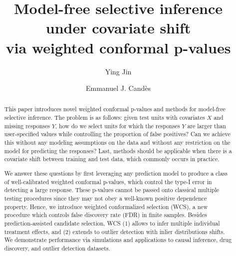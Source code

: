 {\small
}

{\small
}

{\small
}

{\small
}


\title{Model-free selective inference under covariate shift\\ via weighted conformal p-values}
\author[1]{Ying Jin}
\author[1,2]{Emmanuel J. Cand\`es}
\date{}


\maketitle

\begin{abstract}

  This paper introduces novel weighted conformal p-values and methods for model-free selective inference. The problem is as follows: given test units with covariates $X$ and missing responses $Y$, how do we select units for which the responses $Y$ are larger than user-specified values while controlling the proportion of false positives? Can we achieve this without any modeling assumptions on the data and without any restriction on the model for predicting the responses? Last, methods should be applicable when there is a covariate shift between training and test data, which commonly occurs in practice.

  We answer these questions by first leveraging any prediction model to produce a class of well-calibrated weighted conformal p-values, which control the type-I error in detecting a large response. These p-values cannot be passed onto classical multiple testing procedures since they may not obey a well-known positive dependence property. Hence, we introduce weighted conformalized selection (WCS), a new procedure which controls false discovery rate (FDR) in finite samples. Besides prediction-assisted candidate selection, WCS (1) allows to infer multiple individual treatment effects, and (2) extends to outlier detection with inlier distributions shifts. We demonstrate performance via simulations and applications to causal inference, drug discovery, and outlier detection datasets.
\end{abstract}


